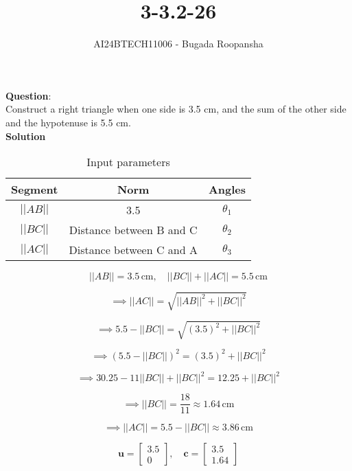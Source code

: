 \documentclass[journal]{IEEEtran}
\begin{document}

\vspace{3cm}

\title{3-3.2-26}
\author{AI24BTECH11006 - Bugada Roopansha}
{\let\newpage\relax\maketitle}  %

\renewcommand{\thefigure}{\theenumi}
\renewcommand{\thetable}{\theenumi}
\setlength{\intextsep}{10pt} %

\textbf{Question}:\\
Construct a right triangle when one side is 3.5 cm, and the sum of the other side and the hypotenuse is 5.5 cm.\\

\textbf{Solution}\\

\begin{table}[h!]
\centering
\begin{tabular}{|c|c|c|}
\hline
	\textbf{Segment} & \textbf{Norm} & \textbf{Angles}\\ \hline
	\( ||AB|| \) & 3.5 & $\theta_1$\\ \hline
	\( ||BC|| \) & Distance between B and C & $\theta_2$\\ \hline
	\( ||AC|| \) & Distance between C and A & $\theta_3$\\ \hline
\end{tabular}
\caption{Input parameters}
\end{table}

\[ 
||AB|| = 3.5 \, \text{cm}, \quad ||BC|| + ||AC|| = 5.5 \, \text{cm}  
\]

\[
\implies ||AC|| = \sqrt{||AB||^2 + ||BC||^2}  
\]

\[
\implies 5.5 - ||BC|| = \sqrt{(3.5)^2 + ||BC||^2}  
\]

\[
\implies (5.5 - ||BC||)^2 = (3.5)^2 + ||BC||^2  
\]

\[
\implies 30.25 - 11||BC|| + ||BC||^2 = 12.25 + ||BC||^2  
\]

\[
\implies ||BC|| = \frac{18}{11} \approx 1.64 \, \text{cm} 
\]

\[
\implies ||AC|| = 5.5 - ||BC|| \approx 3.86 \, \text{cm} 
\]

\[
\mathbf{u} = \begin{bmatrix} 3.5 \\ 0 \end{bmatrix}, \quad \mathbf{c} = \begin{bmatrix} 3.5 \\ 1.64 \end{bmatrix} 
\]
\end{document}
